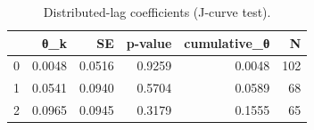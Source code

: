 \begin{table}[t]
\centering\small
\begin{tabular}{lrrrrr}
\toprule
 & θ\_k & SE & p-value & cumulative\_θ & N \\
\midrule
0 & 0.0048 & 0.0516 & 0.9259 & 0.0048 & 102 \\
1 & 0.0541 & 0.0940 & 0.5704 & 0.0589 & 68 \\
2 & 0.0965 & 0.0945 & 0.3179 & 0.1555 & 65 \\
\bottomrule
\end{tabular}
\caption{Distributed-lag coefficients (J-curve test).}
\label{tab:jcurve}
\end{table}
